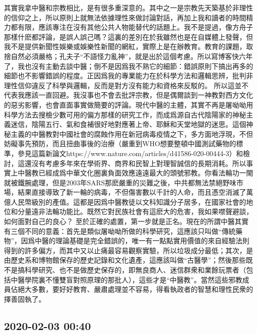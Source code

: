 \documentclass[twocolumn]{ctexart}
\begin{document}
其實我拿中醫和宗教相比，是有很多重深意的。其中之一是宗教先天築基於非理性的信仰之上，所以原則上就無法依據理性來做討論對話，再加上我和讀者的時間精力都有限，應該專注在沒有其他公共人物能替代的話題上。我不是提過，像方舟子那樣什麽都評論，是誤人誤己嗎？這裏的差別在於我雖然也是在自媒體上發聲，但我不是提供新聞性娛樂或娛樂性新聞的網紅，實際上是在辦教育。教育的課題，取捨自然必須嚴格；孔夫子“不語怪力亂神”，就是出於這個考慮。所以寫博客快六年了，我也沒有主動去談中醫；倒不是因爲我不熟它的細節：錯誤原則下搞出再多的細節也不影響錯誤的程度。正因爲我的專業能力在於科學方法和邏輯思辨，批判非理性信仰違反了科學與邏輯，反而是對方沒有能力和資格來反駁的。
所以這並不代表我應該一直回避。我沒事也不會去批評宗教，但是偶爾談到一神教對西方文化的惡劣影響，也會直面事實做簡要的評論。現代中醫的主體，其實不再是屠呦呦用科學方法去搜檢少數可用的偏方那樣的研究工作，而成爲源自古代陰陽家的神秘主義迷信，陰陽五行、氣和食補很好地對應著上帝、耶穌和天堂地獄的迷思。這個神秘主義的中醫教對中國社會的腐蝕作用在新冠病毒疫情之下，多方面地浮現，不但妨礙事先預防，而且扭曲事後的治療（嚴重到WHO想要整頓中國測試藥物的標準，參見這篇新論文https://www.nature.com/articles/d41586-020-00444-3）和檢討，這還沒有考慮多年來在學術界、商界和民智上對理智誠信的長期消耗。所以事實上中醫教已經成爲中華文化圈裏負面效應遠遠最大的頭號邪教。你看法輪功一閙就被鐵腕處理，但是2003年SARS那麽嚴重的災難之後，中共都無法禁絕野味市場，結果直接導致了新一輪的病毒，不但傷害數以千計的人命，而且憑空消滅了萬億人民幣級別的產值。這都是因爲中醫教徒以文科知識分子居多，在國家社會的地位和分量遠非法輪功能比。既然它對民族社會有這麽大的危害，我如果噤聲避談，如何面對自己的良心？
至於正確的處置，第一步就是正名。現在的所謂中醫其實有三個不同的意義：首先是類似屠呦呦所做的科學研究，這應該只叫做“傳統藥物”，因爲中醫的理論基礎是完全錯誤的，唯一有一點點實用價值的來自經驗法則得到的許多偏方，而其中又以止痛最容易觀察實驗，所以垃圾成分最低；其次，是由歷史系和博物館保存的歷史記錄和文化遺產，這應該叫做“古醫學”；然後那些既不是搞科學研究、也不是做歷史保存的，即無良商人、迷信群衆和業餘玩票者（包括中醫學院裏不懂雙盲對照原理的那批人），這些才是“中醫教”。當然這些邪教成員佔絕大多數，要好好教育、嚴肅處理並不容易，得看執政者的智慧和理性民衆的擇善固執了。
\subsection*{2020-02-03 00:40}
\end{document}
